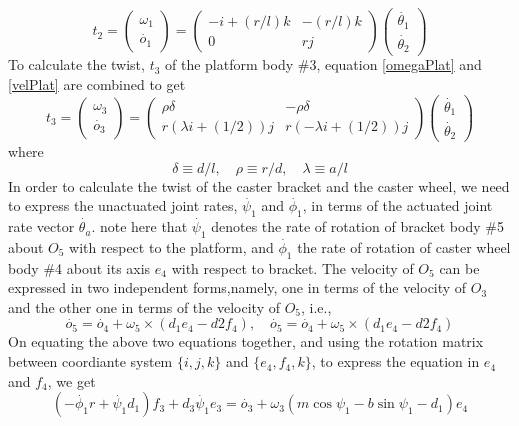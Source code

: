 \begin{equation}
\label{twist2}
t_2=\begin{pmatrix}
\omega_1\\\dot{o_1}
\end{pmatrix}=
\begin{pmatrix}
-i+(r/l)k & -(r/l)k\\  0 &rj
\end{pmatrix}
\begin{pmatrix}
\dot{\theta_1}\\\dot{\theta_2}
\end{pmatrix}
\end{equation}
To calculate the twist, $t_3$ of the platform body \#3, equation \ref{omegaPlat} and \ref{velPlat} are combined to get
\begin{equation}
\label{twist3}
t_3=\begin{pmatrix}
\omega_3\\\dot{o_3}
\end{pmatrix}=
\begin{pmatrix}
\rho\delta & -\rho\delta\\
r(\lambda i+(1/2))j & r(-\lambda i+(1/2))j
\end{pmatrix}
\begin{pmatrix}
\dot{\theta_1}\\\dot{\theta_2}
\end{pmatrix}
\end{equation}
where
\[ \delta\equiv d/l, \quad \rho \equiv r/d, \quad \lambda \equiv a/l \]
In order to calculate the twist of the caster bracket and the caster wheel, we need to express the  unactuated joint rates, $\dot{\psi_1}$ and $\dot{\phi_1}$, in terms of the actuated joint rate vector $\dot{\theta_a}$. note here that $\dot{\psi_1}$ denotes the rate of rotation of bracket body \#5 about $O_5$ with respect to the platform, and 
$\dot{\phi_1}$ the rate of rotation of caster wheel body \#4 about its axis $e_4$ with respect to bracket. The velocity of $O_5$ can be expressed in two independent forms,namely, one in terms of the velocity of $O_3$ and the other one in terms of the velocity of $O_5$, i.e.,
\begin{equation}
\dot{o_5}=\dot{o_4}+\omega_5\times(d_1e_4-d2f_4), \quad
\dot{o_5}=\dot{o_4}+\omega_5\times(d_1e_4-d2f_4)
\end{equation}
On equating the above two equations together, and using the rotation matrix between coordiante system $\{i,j,k\}$ and $\{e_4,f_4,k\}$, to express the equation in $e_4$ and $f_4$, we get
\begin{equation}
(-\dot{\phi_1}r+\dot{\psi_1}d_1)f_3+d_3\dot{\psi_1}e_3=\dot{o_3}
+\omega_3(m\cos\psi_1-b\sin\psi_1-d_1)e_4
\end{equation} 
